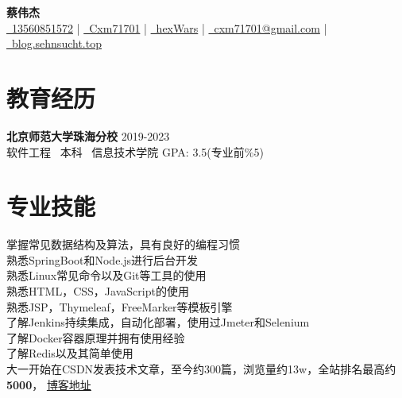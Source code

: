 \documentclass[a4paper,8pt]{article}
\begin{document}
\pagestyle{empty}
\setlength{\parindent}{0pt}


\begin{center}
    \textbf{\Huge 蔡伟杰} \\ 
    \vspace{5pt} %
    \hspace{10pt}
    \href{tel:+8613560851572}{\faPhoneVolume \ 13560851572} | 
    \href{weixin:Cxm71701}{\faWeixin \ Cxm71701} | 
    \href{https://github.com/hexWars}{\faGithub \ hexWars}  | 
    \href{mailto:cxm71701@gmail.com}{\faEnvelope \ cxm71701@gmail.com} | 
    \href{https://blog.sehnsucht.top/}{\faRss \ blog.sehnsucht.top}
    \vspace{-5pt}
\end{center}


\ignorespaces
\section{\textbf{教育经历}}
\begin{apart}{6}{0.5}
    \textbf{北京师范大学珠海分校} \hfill 2019-2023 \\
    软件工程 \ 本科 \ 信息技术学院 \hfill GPA: 3.5(专业前\%5)
\end{apart}
\ignorespaces


\section{\textbf{专业技能}}
\begin{apart}{6}{0.5}
    \textbullet 掌握常见数据结构及算法，具有良好的编程习惯 \\
    \textbullet 熟悉SpringBoot和Node.js进行后台开发 \\
    \textbullet 熟悉Linux常见命令以及Git等工具的使用 \\
    \textbullet 熟悉HTML，CSS，JavaScript的使用 \\
    \textbullet 熟悉JSP，Thymeleaf，FreeMarker等模板引擎 \\
    \textbullet 了解Jenkins持续集成，自动化部署，使用过Jmeter和Selenium \\
    \textbullet 了解Docker容器原理并拥有使用经验 \\
    \textbullet 了解Redis以及其简单使用 \\

大一开始在CSDN发表技术文章，至今约300篇，浏览量约13w，全站排名最高约\textbf{5000}， \href{https://blog.csdn.net/Dueser}{博客地址}
\end{apart}
\ignorespaces
\end{document}
